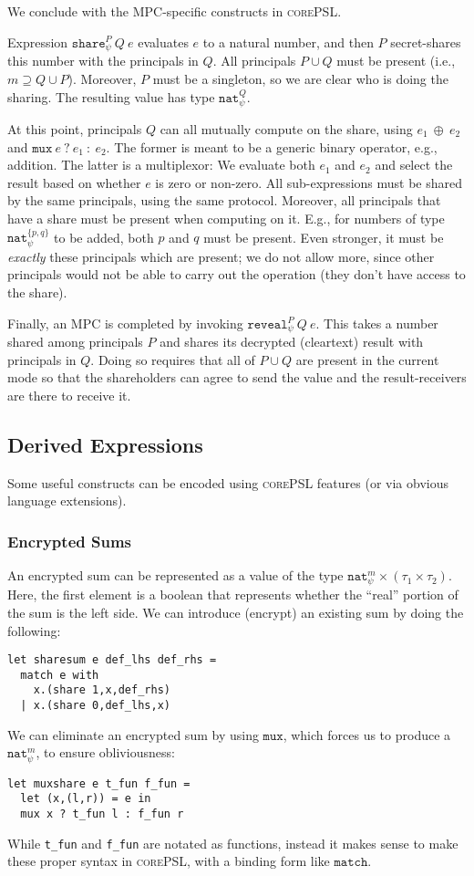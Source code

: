 \documentclass[10pt]{article}
\newcommand{\kw}[1]{\ensuremath{\mathtt{#1}}}
\newcommand{\tnat}{\ensuremath{\mathtt{nat}}}
\newcommand{\tprod}[2]{\ensuremath{{#1} \times {#2}}}
\newcommand{\ebinop}[2]{\ensuremath{{#1}~\oplus~{#2}}}
\newcommand{\ereveal}[4]{\ensuremath{\kw{reveal}^{#1}_{#4}~{#2}~{#3}}}
\newcommand{\emux}[3]{\ensuremath{\kw{mux}~{#1}~\kw{?}~{#2}~\kw{:}~{#3}}}
\newcommand{\eshare}[4]{\ensuremath{\kw{share}^{#2}_{#1}~{#3}~{#4}}}
\newcommand{\lang}{\textsc{corePSL}\xspace}
\begin{document}
We conclude with the MPC-specific constructs in \lang.

Expression $\eshare{\psi}{P}{Q}{e}$ evaluates $e$ to a natural number,
and then $P$ secret-shares this number with the principals in $Q$. All
principals $P \cup Q$ must be present (i.e.,
$m \supseteq Q \cup P$). Moreover, $P$ must be a singleton, so we
are clear who is doing the sharing. The resulting value has type
$\tnat^Q_\psi$.

At this point, principals $Q$ can all mutually compute on the share,
using $\ebinop{e_1}{e_2}$ and $\emux{e}{e_1}{e_2}$. The former is
meant to be a generic binary operator, e.g., addition. The latter is a
multiplexor: We evaluate both $e_1$ and $e_2$ and select the result
based on whether $e$ is zero or non-zero. All sub-expressions must be
shared by the same principals, using the same protocol. Moreover, all
principals that have a share must be present when computing on
it. E.g., for numbers of type $\tnat^{\{p,q\}}_\psi$ to be added, both
$p$ and $q$ must be present. Even stronger, it must be \emph{exactly}
these principals which are present; we do not allow more, since other
principals would not be able to carry out the operation (they don't
have access to the share).

Finally, an MPC is completed by invoking
$\ereveal{P}{Q}{e}{\psi}$. This takes a number shared among principals
$P$ and shares its decrypted (cleartext) result with principals in
$Q$. Doing so requires that all of $P \cup Q$ are present in the
current mode so that the shareholders can agree to send the value and
the result-receivers are there to receive it.

\subsection{Derived Expressions}
\label{sec:derived}

Some useful constructs can be encoded using \lang features (or via
obvious language extensions). 

\subsubsection{Encrypted Sums}

An encrypted sum can be represented as a value of the type
$\tprod{\tnat^m_\psi}{(\tprod{\tau_1}{\tau_2})}$. Here, the first
element is a boolean that represents whether the ``real'' portion of
the sum is the left side. We can introduce (encrypt) an existing sum
by doing the following:
\begin{verbatim}
let sharesum e def_lhs def_rhs =
  match e with
    x.(share 1,x,def_rhs)
  | x.(share 0,def_lhs,x)
\end{verbatim}
We can eliminate an encrypted sum by using $\kw{mux}$, which forces us
to produce a $\tnat^m_\psi$, to ensure obliviousness:
\begin{verbatim}
let muxshare e t_fun f_fun =
  let (x,(l,r)) = e in
  mux x ? t_fun l : f_fun r
\end{verbatim}
While \verb+t_fun+ and \verb+f_fun+ are notated as functions, instead
it makes sense to make these proper syntax in \lang, with a
binding form like $\kw{match}$.
\end{document}
